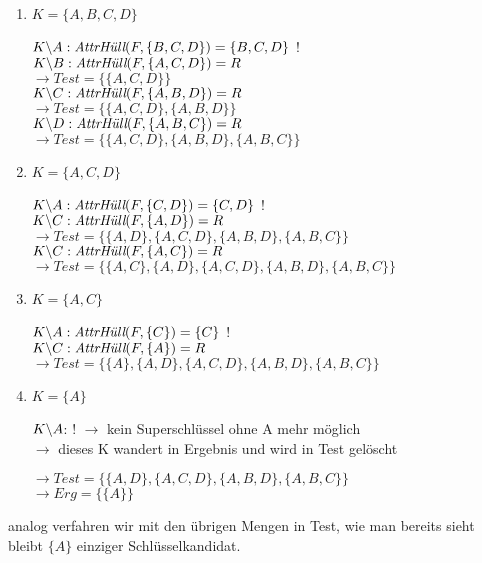 \documentclass{lehramt-informatik}
\begin{document}
\begin{enumerate}


\item $K = \{A, B, C, D\}$

$K \SLASH A: \textit{AttrHüll}(F, \{B, C, D\}) = \{B, C, D\}$ !\\

$K \SLASH B: \textit{AttrHüll}(F, \{A, C, D\}) = R$\\
$\rightarrow Test = \{\{A, C, D\}\}$ \\

$K \SLASH C: \textit{AttrHüll}(F, \{A, B, D\}) = R$\\
$\rightarrow Test = \{\{A, C, D\}, \{A, B, D\}\}$ \\

$K \SLASH D: \textit{AttrHüll}(F, \{A, B, C\}) = R$\\
$\rightarrow Test = \{\{A, C, D\}, \{A, B, D\}, \{A, B, C\}\}$ \\


\item $K = \{A, C, D\}$

$K \SLASH A: \textit{AttrHüll}(F, \{C, D\}) = \{C, D\}$ !\\

$K \SLASH C: \textit{AttrHüll}(F, \{A, D\}) = R$\\
$\rightarrow Test = \{\{A, D\}, \{A, C, D\}, \{A, B, D\}, \{A, B, C\}\}$ \\

$K \SLASH C: \textit{AttrHüll}(F, \{A, C\}) = R$\\
$\rightarrow Test = \{\{A, C\}, \{A, D\}, \{A, C, D\}, \{A, B, D\}, \{A, B, C\}\}$ \\


\item $K = \{A, C\}$

$K \SLASH A: \textit{AttrHüll}(F, \{C\}) = \{C\}$ !\\

$K \SLASH C: \textit{AttrHüll}(F, \{A\}) = R$\\
$\rightarrow Test = \{\{A\}, \{A, D\}, \{A, C, D\}, \{A, B, D\}, \{A, B, C\}\}$ \\


\item $K = \{A\}$

$K \SLASH A$: ! $\rightarrow$ kein Superschlüssel ohne A mehr möglich\\
$\rightarrow$ dieses K wandert in Ergebnis und wird in Test gelöscht

$\rightarrow Test = \{\{A, D\}, \{A, C, D\}, \{A, B, D\}, \{A, B, C\}\}$ \\
$\rightarrow Erg = \{\{A\}\}$ \\
\end{enumerate}

analog verfahren wir mit den übrigen Mengen in Test, wie man bereits
sieht bleibt $\{A\}$ einziger Schlüsselkandidat.

\literatur
\end{document}
